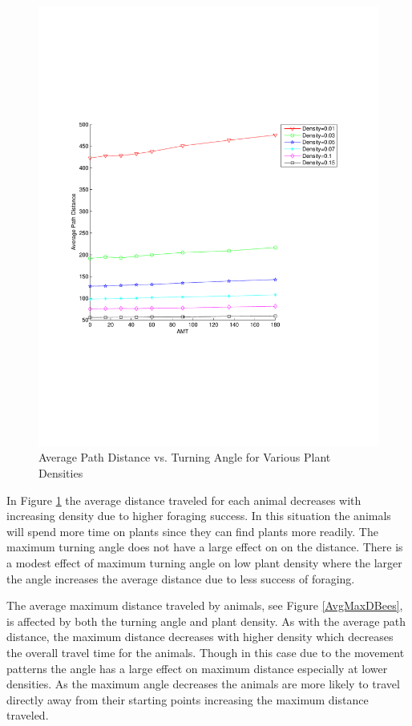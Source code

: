 \begin{figure}
  \begin{center}
  \includegraphics[width=.5\linewidth,scale=.5]{PathVsAMT.pdf}
  \end{center}
  \caption{\small Average Path Distance vs. Turning Angle for Various Plant Densities}
  \label{AvgPathN}
\end{figure}

In Figure \ref{AvgPathN} the average distance traveled for each animal decreases with increasing
density due to higher foraging success.  In this situation the animals will spend more time on
plants since they can find plants more readily.  The maximum turning angle does not have a large
effect on on the distance.  There is a modest effect of maximum turning angle on low plant density
where the larger the angle increases the average distance due to less success of foraging.

The average maximum distance traveled by animals, see Figure \ref{AvgMaxDBees}, is affected by both
the turning angle and plant density. As with the average path distance, the maximum distance
decreases with higher density which decreases the overall travel time for the animals.  Though in
this case due to the movement patterns the angle has a large effect on maximum distance especially
at lower densities.  As the maximum angle decreases the animals are more likely to travel directly
away from their starting points increasing the maximum distance traveled.

